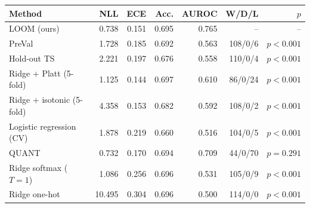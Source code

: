 \begin{tabular}{lrrrrrr}
\toprule
Method & NLL & ECE & Acc. & AUROC & W/D/L & $p$ \\
\midrule
LOOM (ours) & 0.738 & 0.151 & 0.695 & 0.765 & -- & -- \\
PreVal & 1.728 & 0.185 & 0.692 & 0.563 & 108/0/6 & $p<0.001$ \\
Hold-out TS & 2.221 & 0.197 & 0.676 & 0.558 & 110/0/4 & $p<0.001$ \\
Ridge + Platt (5-fold) & 1.125 & 0.144 & 0.697 & 0.610 & 86/0/24 & $p<0.001$ \\
Ridge + isotonic (5-fold) & 4.358 & 0.153 & 0.682 & 0.592 & 108/0/2 & $p<0.001$ \\
Logistic regression (CV) & 1.878 & 0.219 & 0.660 & 0.516 & 104/0/5 & $p<0.001$ \\
QUANT & 0.732 & 0.170 & 0.694 & 0.709 & 44/0/70 & $p=0.291$ \\
Ridge softmax ($T=1$) & 1.086 & 0.256 & 0.696 & 0.531 & 105/0/9 & $p<0.001$ \\
Ridge one-hot & 10.495 & 0.304 & 0.696 & 0.500 & 114/0/0 & $p<0.001$ \\
\bottomrule
\end{tabular}
